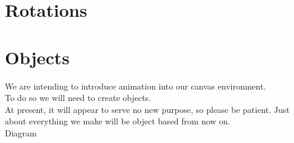 \documentclass[a4paper,12pt]{article}
\begin{document}
\section{Rotations}
\newpage
\section{Objects}
We are intending to introduce animation into our canvas environment.\\
To do so we will need to create objects.\\
At present, it will appear to serve no new purpose, so please be patient. Just about everything we make will be object based from now on.\\
Diagram\\



\newpage
\end{document}
